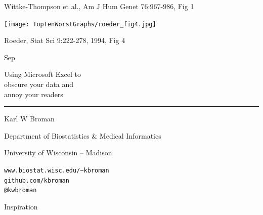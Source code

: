 \documentclass[12pt]{article}
\newcommand{\titlesize}{\fontsize{40}{50} \selectfont}
\newcommand{\headsize}{\fontsize{35}{35} \selectfont}
\newcommand{\textsize}{\fontsize{30}{35} \selectfont}
\newcommand{\smallersize}{\fontsize{20}{25} \selectfont}
\newcommand{\smallestsize}{\fontsize{18}{22} \selectfont}
\begin{document}
\vfill \hfill \smallestsize \color{blue}
Wittke-Thompson et al., Am J Hum Genet 76:967-986, Fig 1

\newpage
\thispagestyle{empty}


\headsize \color{yellow}
\hfill \begin{minipage}{5.75in}
\end{minipage}

\vspace{30mm}

\centerline{\texttt{[image: TopTenWorstGraphs/roeder\_fig4.jpg]}}


\vfill \hfill \smallestsize \color{blue}
Roeder, Stat Sci 9:222-278, 1994, Fig 4



\newpage

Sep


\newpage

\thispagestyle{empty}

\begin{center}
\titlesize \color{yellow}

\vspace*{10mm}

{\headsize Using Microsoft Excel to \\[12pt]
obscure your data and \\[2pt]
annoy your readers}


\color{pink}
\rule{10in}{1mm}

\vspace{10mm}

\textsize \color{blue}
Karl W Broman
\vspace{5mm}

{\smallersize Department of Biostatistics \& Medical Informatics

University of Wisconsin -- Madison
\vspace{20mm}



\verb|www.biostat.wisc.edu/~kbroman| \\
\verb|github.com/kbroman| \\
\verb|@kwbroman|

}

\end{center}





\newpage

\headsize \color{yellow}
\hfill 
\begin{minipage}{5.75in}
\centering
Inspiration
\end{minipage}
\end{document}
